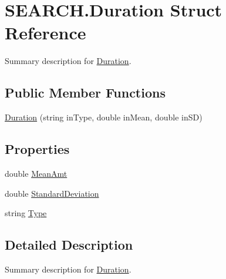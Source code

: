 \hypertarget{struct_s_e_a_r_c_h_1_1_duration}{\section{S\-E\-A\-R\-C\-H.\-Duration Struct Reference}
\label{struct_s_e_a_r_c_h_1_1_duration}
}


Summary description for \hyperlink{struct_s_e_a_r_c_h_1_1_duration}{Duration}.  


\subsection*{Public Member Functions}
\begin{DoxyCompactItemize}
\item 
\hyperlink{struct_s_e_a_r_c_h_1_1_duration_a1a6b36c76b54c900adf43c5a82d43122}{Duration} (string in\-Type, double in\-Mean, double in\-S\-D)
\end{DoxyCompactItemize}
\subsection*{Properties}
\begin{DoxyCompactItemize}
\item 
double \hyperlink{struct_s_e_a_r_c_h_1_1_duration_aa3efd8fee940b36f5286f814bbce9f97}{Mean\-Amt}
\item 
double \hyperlink{struct_s_e_a_r_c_h_1_1_duration_abd2fd1478a37e9f17c39062878d1805e}{Standard\-Deviation}
\item 
string \hyperlink{struct_s_e_a_r_c_h_1_1_duration_ab51c7298f0c8181cd0f22d965090ca5a}{Type}
\end{DoxyCompactItemize}


\subsection{Detailed Description}
Summary description for \hyperlink{struct_s_e_a_r_c_h_1_1_duration}{Duration}. 



